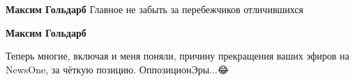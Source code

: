 \begin{itemize}
\begin{itemize}
 
\textbf{Максим Гольдарб} Главное не забыть за перебежчиков отличившихся

 
\textbf{Максим Гольдарб} 

Теперь многие, включая и меня поняли, причину прекращения ваших эфиров на
NewsOne, за чёткую позицию. ОппозиционЭры...😂

\end{itemize}


\end{itemize}

